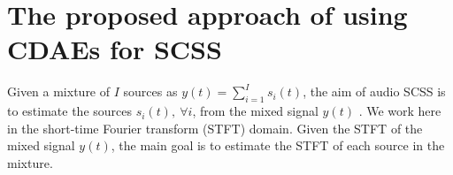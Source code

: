 \documentclass{article}
\begin{document}
%

\section{The proposed approach of using CDAEs for SCSS}
\label{overall}
Given a mixture of $I$ sources as $y(t) = \sum_{i=1}^I s_i(t)$, the aim of audio SCSS is to estimate the sources $s_i(t), \ \forall{i}$, from the mixed signal $y(t)$ \cite{emad:12:avsrwbmscss,emad:12:stpsnmfscss}. We work here in the short-time Fourier transform (STFT) domain. Given the STFT of the mixed signal $y(t)$, the main goal is to estimate the STFT of each source in the mixture.
\end{document}
